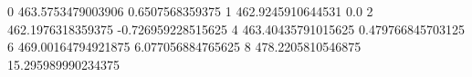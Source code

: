 0 463.5753479003906 0.6507568359375
1 462.9245910644531 0.0
2 462.1976318359375 -0.726959228515625
4 463.40435791015625 0.479766845703125
6 469.00164794921875 6.077056884765625
8 478.2205810546875 15.295989990234375
